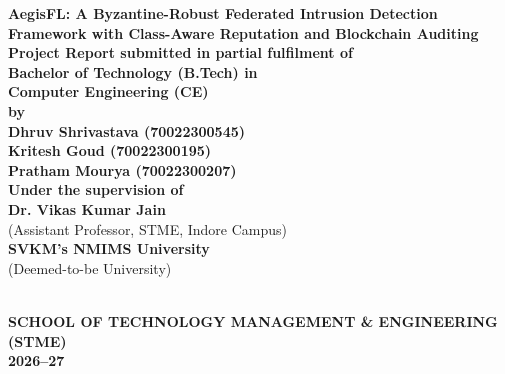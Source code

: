 \documentclass[12pt,a4paper]{report}
\begin{document}
\begin{titlepage}
\centering
\vspace*{0.5cm}

{\LARGE \textbf{AegisFL: A Byzantine-Robust Federated Intrusion Detection Framework with Class-Aware Reputation and Blockchain Auditing}}\\[1.8cm]

{\large \textbf{Project Report submitted in partial fulfilment of}}\\[0.3cm]
{\large \textbf{Bachelor of Technology (B.Tech) in}}\\[0.3cm]
{\large \textbf{Computer Engineering (CE)}}\\[1.2cm]

{\large \textbf{by}}\\[0.4cm]
{\large \textbf{Dhruv Shrivastava (70022300545)}}\\[0.2cm]
{\large \textbf{Kritesh Goud (70022300195)}}\\[0.2cm]
{\large \textbf{Pratham Mourya (70022300207)}}\\[1.5cm]

{\large \textbf{Under the supervision of}}\\[0.3cm]
{\large \textbf{Dr. Vikas Kumar Jain}}\\[0.15cm]
{\normalsize (Assistant Professor, STME, Indore Campus)}\\[1.6cm]

{\large \textbf{SVKM's NMIMS University}}\\[0.15cm]
{\normalsize (Deemed-to-be University)}\\[0.6cm]

\\[0.6cm]

{\normalsize \textbf{SCHOOL OF TECHNOLOGY MANAGEMENT \& ENGINEERING (STME)}}\\[0.2cm]
{\normalsize \textbf{2026--27}}

\end{titlepage}

\newpage
{}
\setcounter{page}{2}
\end{document}
